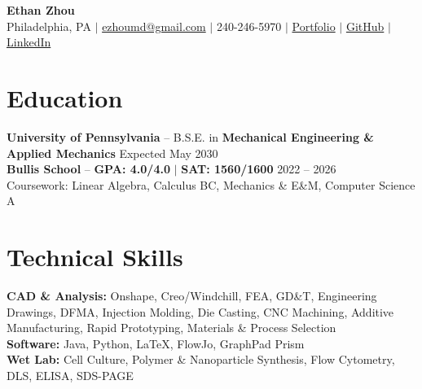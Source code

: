 \documentclass[10pt, letterpaper]{article}
\begin{document}
\begin{center}
    {\sffamily\LARGE\bfseries Ethan Zhou}
    \vspace{2pt} \\
    Philadelphia, PA 
    $|$
    \href{mailto:ezhoumd@gmail.com}{ezhoumd@gmail.com}
    $|$
    240-246-5970
    $|$
    \href{https://ezhoumd.github.io/personal-portfolio/}{Portfolio}
    $|$
    \href{https://github.com/ezhoumd}{GitHub}
    $|$
    \href{https://www.linkedin.com/in/ezhoumd/}{LinkedIn}
\end{center}

\section{Education}
    \textbf{University of Pennsylvania} -- B.S.E. in \textbf{Mechanical Engineering \& Applied Mechanics}
    \hfill Expected May 2030 \\
    \textbf{Bullis School} -- \textbf{GPA: 4.0/4.0} $|$ \textbf{SAT: 1560/1600}
    \hfill 2022 -- 2026 \\
    Coursework: Linear Algebra, Calculus BC, Mechanics \& E\&M, Computer Science A

\section{Technical Skills}
    \textbf{CAD \& Analysis:} Onshape, Creo/Windchill, FEA, GD\&T, Engineering Drawings, DFMA, Injection Molding, Die Casting, CNC Machining, Additive Manufacturing, Rapid Prototyping, Materials \& Process Selection \\
    \textbf{Software:} Java, Python, LaTeX, FlowJo, GraphPad Prism \\
    \textbf{Wet Lab:} Cell Culture, Polymer \& Nanoparticle Synthesis, Flow Cytometry, DLS, ELISA, SDS-PAGE
\end{document}
